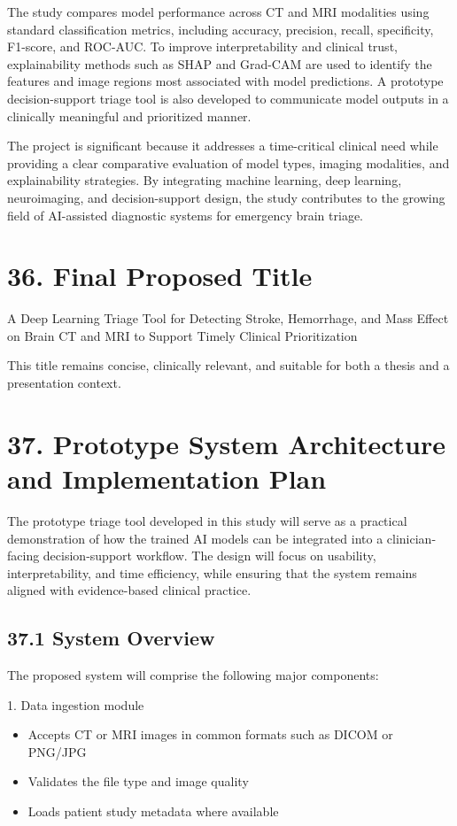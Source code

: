 \documentclass[12pt,a4paper]{report}
\begin{document}
The study compares model performance across CT and MRI modalities using standard classification metrics, including accuracy, precision, recall, specificity, F1-score, and ROC-AUC. To improve interpretability and clinical trust, explainability methods such as SHAP and Grad-CAM are used to identify the features and image regions most associated with model predictions. A prototype decision-support triage tool is also developed to communicate model outputs in a clinically meaningful and prioritized manner.

The project is significant because it addresses a time-critical clinical need while providing a clear comparative evaluation of model types, imaging modalities, and explainability strategies. By integrating machine learning, deep learning, neuroimaging, and decision-support design, the study contributes to the growing field of AI-assisted diagnostic systems for emergency brain triage.


\section{36. Final Proposed Title}

A Deep Learning Triage Tool for Detecting Stroke, Hemorrhage, and Mass Effect on Brain CT and MRI to Support Timely Clinical Prioritization

This title remains concise, clinically relevant, and suitable for both a thesis and a presentation context.


\section{37. Prototype System Architecture and Implementation Plan}

The prototype triage tool developed in this study will serve as a practical demonstration of how the trained AI models can be integrated into a clinician-facing decision-support workflow. The design will focus on usability, interpretability, and time efficiency, while ensuring that the system remains aligned with evidence-based clinical practice.

\subsection{37.1 System Overview}

The proposed system will comprise the following major components:

1. Data ingestion module
\begin{itemize}
\item Accepts CT or MRI images in common formats such as DICOM or PNG/JPG
\item Validates the file type and image quality
\item Loads patient study metadata where available
\end{itemize}
\end{document}
